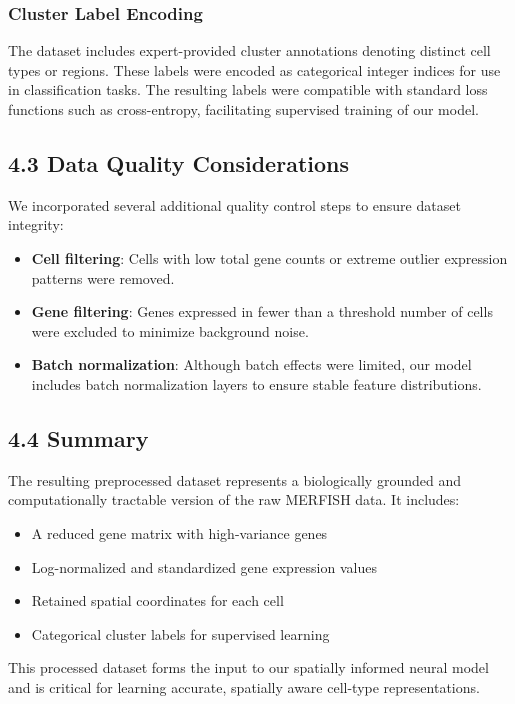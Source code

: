\documentclass[unnumsec,webpdf,contemporary,medium]{oup-authoring-template}
\begin{document}
\subsubsection{Cluster Label Encoding}

The dataset includes expert-provided cluster annotations denoting distinct cell types or regions. These labels were encoded as categorical integer indices for use in classification tasks. The resulting labels were compatible with standard loss functions such as cross-entropy, facilitating supervised training of our model.

\subsection{4.3 Data Quality Considerations}

We incorporated several additional quality control steps to ensure dataset integrity:

\begin{itemize}
    \item \textbf{Cell filtering}: Cells with low total gene counts or extreme outlier expression patterns were removed.
    \item \textbf{Gene filtering}: Genes expressed in fewer than a threshold number of cells were excluded to minimize background noise.
    \item \textbf{Batch normalization}: Although batch effects were limited, our model includes batch normalization layers to ensure stable feature distributions.
\end{itemize}

\subsection{4.4 Summary}

The resulting preprocessed dataset represents a biologically grounded and computationally tractable version of the raw MERFISH data. It includes:
\begin{itemize}
    \item A reduced gene matrix with high-variance genes
    \item Log-normalized and standardized gene expression values
    \item Retained spatial coordinates for each cell
    \item Categorical cluster labels for supervised learning
\end{itemize}

This processed dataset forms the input to our spatially informed neural model and is critical for learning accurate, spatially aware cell-type representations.
\end{document}
